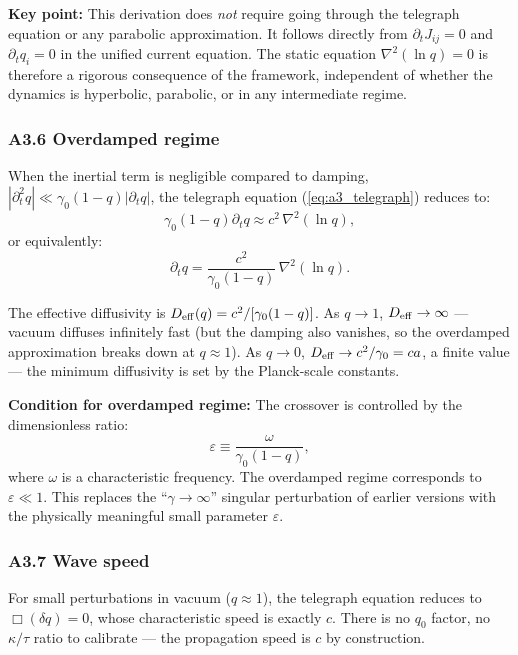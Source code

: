 \documentclass[reprint]{revtex4-2}
\begin{document}
\textbf{Key point:} This derivation does \emph{not} require going through the telegraph equation or any parabolic approximation. It follows directly from $\partial_t J_{ij}=0$ and $\partial_t q_i=0$ in the unified current equation. The static equation $\nabla^2(\ln q)=0$ is therefore a rigorous consequence of the framework, independent of whether the dynamics is hyperbolic, parabolic, or in any intermediate regime.

\subsubsection{A3.6 Overdamped regime}

When the inertial term is negligible compared to damping, $|\partial_t^2 q| \ll \gamma_0(1-q)|\partial_t q|$, the telegraph equation (\ref{eq:a3_telegraph}) reduces to:
\begin{equation}
\gamma_0(1-q)\partial_t q \approx c^2\,\nabla^2(\ln q),
\end{equation}
or equivalently:
\begin{equation}
\boxed{\partial_t q = \frac{c^2}{\gamma_0(1-q)}\,\nabla^2(\ln q)}.
\label{eq:a3_overdamped}
\end{equation}

The effective diffusivity is $D_{\rm eff}(q) = c^2/[\gamma_0(1-q)]$. As $q\to 1$, $D_{\rm eff}\to\infty$ --- vacuum diffuses infinitely fast (but the damping also vanishes, so the overdamped approximation breaks down at $q\approx 1$). As $q\to 0$, $D_{\rm eff}\to c^2/\gamma_0 = ca$, a finite value --- the minimum diffusivity is set by the Planck-scale constants.

\textbf{Condition for overdamped regime:} The crossover is controlled by the dimensionless ratio:
\begin{equation}
\varepsilon \equiv \frac{\omega}{\gamma_0(1-q)},
\end{equation}
where $\omega$ is a characteristic frequency. The overdamped regime corresponds to $\varepsilon \ll 1$. This replaces the ``$\gamma\to\infty$'' singular perturbation of earlier versions with the physically meaningful small parameter $\varepsilon$.

\subsubsection{A3.7 Wave speed}

For small perturbations in vacuum ($q\approx 1$), the telegraph equation reduces to $\Box(\delta q)=0$, whose characteristic speed is exactly $c$. There is no $q_0$ factor, no $\kappa/\tau$ ratio to calibrate --- the propagation speed is $c$ by construction.
\end{document}
